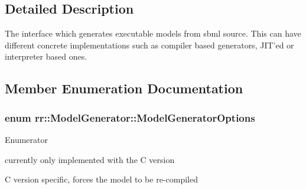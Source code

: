 \subsection{Detailed Description}
The interface which generates executable models from sbml source. This can have different concrete implementations such as compiler based generators, J\-I\-T'ed or interpreter based ones. 

\subsection{Member Enumeration Documentation}
\hypertarget{classrr_1_1_model_generator_a4f280529e0531ec3132c80ffda967767}{
\subsubsection[{Model\-Generator\-Options}]{\setlength{\rightskip}{0pt plus 5cm}enum {\bf rr\-::\-Model\-Generator\-::\-Model\-Generator\-Options}}}\label{classrr_1_1_model_generator_a4f280529e0531ec3132c80ffda967767}
\begin{Desc}
\item[Enumerator]\par
\begin{description}
\item[{\em 
\hypertarget{classrr_1_1_model_generator_a4f280529e0531ec3132c80ffda967767ae7234e27c5800a53fdafaba33a92e9d0}{Compute\-And\-Assign\-Consevation\-Laws}\label{classrr_1_1_model_generator_a4f280529e0531ec3132c80ffda967767ae7234e27c5800a53fdafaba33a92e9d0}
}]currently only implemented with the C version \item[{\em 
\hypertarget{classrr_1_1_model_generator_a4f280529e0531ec3132c80ffda967767a369f1d228bd06da224ce2235433af7eb}{Force\-Re\-Compile}\label{classrr_1_1_model_generator_a4f280529e0531ec3132c80ffda967767a369f1d228bd06da224ce2235433af7eb}
}]C version specific, forces the model to be re-\/compiled \end{description}
\end{Desc}


